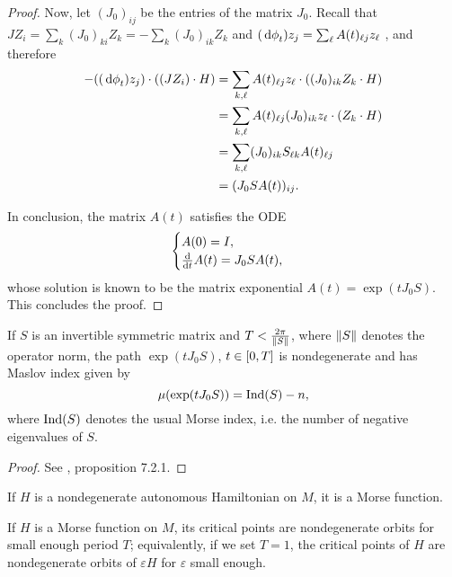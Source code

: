 \begin{proof}
Now, let $(J_0)_{ij}$ be the entries of the matrix $J_0$. Recall that $J Z_i = \sum_k (J_0)_{ki} Z_k = -\sum_k (J_0)_{ik} Z_k$ and $(\dl \phi_t) z_j = \sum_\ell A(t)_{\ell j} z_\ell$ , and therefore
\begin{equation}
\begin{aligned}
- ((\dl \phi_t) z_j) \cdot ((J Z_i) \cdot H) &= \sum_{k,\ell} A(t)_{\ell j} z_\ell \cdot ((J_0)_{ik} Z_k \cdot H)\\
&= \sum_{k,\ell} A(t)_{\ell j} (J_0)_{ik} z_\ell \cdot (Z_k \cdot H)\\
&= \sum_{k,\ell} (J_0)_{ik} S_{\ell k} A(t)_{\ell j}\\
&= (J_0 S A(t))_{ij}.
\end{aligned}
\end{equation}

In conclusion, the matrix $A(t)$ satisfies the ODE
\begin{equation}
\begin{cases}
A(0) = I,\\
\diff*{A(t)}t = J_0 S A(t),
\end{cases}
\end{equation}
whose solution is known to be the matrix exponential $A(t) = \exp(t J_0 S)$. This concludes the proof.
\end{proof}

\begin{prop}\label{prop:maslovexpjs}
If $S$ is an invertible symmetric matrix and $T < \frac{2\pi}{\lVert S\rVert}$, where $\lVert S\rVert$ denotes the operator norm, the path $\exp(t J_0 S)$, $t \in \interval0T$ is nondegenerate and has Maslov index given by
\begin{equation}
\mu(\exp(t J_0 S)) = \operatorname{Ind}(S) - n,
\end{equation}
where $\operatorname{Ind}(S)$ denotes the usual Morse index, i.e. the number of negative eigenvalues of $S$.
\end{prop}

\begin{proof}
See \cite{audin}, proposition 7.2.1.
\end{proof}

\begin{corollary}\label{cor:hammorse}
If $H$ is a nondegenerate autonomous Hamiltonian on $M$, it is a Morse function.

If $H$ is a Morse function on $M$, its critical points are nondegenerate orbits for small enough period $T$; equivalently, if we set $T = 1$, the critical points of $H$ are nondegenerate orbits of $\varepsilon H$ for $\varepsilon$ small enough.
\end{corollary}


